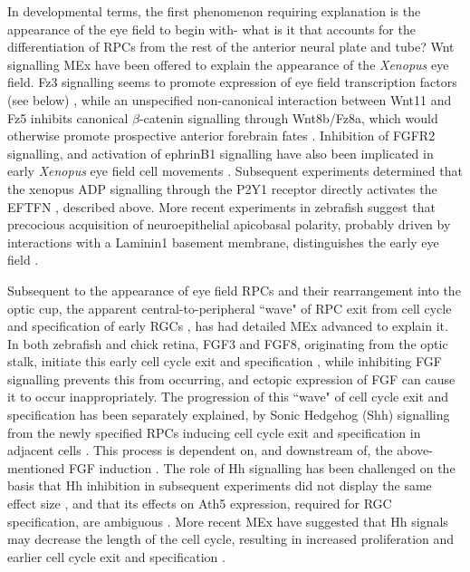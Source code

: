 In developmental terms, the first phenomenon requiring explanation is the appearance of the eye field to begin with- what is it that accounts for the differentiation of RPCs from the rest of the anterior neural plate and tube? Wnt signalling MEx have been offered to explain the appearance of the \textit{Xenopus} eye field. Fz3 signalling seems to promote expression of eye field transcription factors (see below) \cite{Rasmussen2001}, while an unspecified non-canonical interaction between Wnt11 and Fz5 inhibits canonical $\beta$-catenin signalling through Wnt8b/Fz8a, which would otherwise promote prospective anterior forebrain fates \cite{Cavodeassi2005}. Inhibition of FGFR2 signalling, and activation of ephrinB1 signalling have also been implicated in early \textit{Xenopus} eye field cell movements \cite{Moore2004}. Subsequent experiments determined that the xenopus ADP signalling through the P2Y1 receptor directly activates the EFTFN \cite{Masse2007}, described above. More recent experiments in zebrafish suggest that precocious acquisition of neuroepithelial apicobasal polarity, probably driven by interactions with a Laminin1 basement membrane, distinguishes the early eye field \cite{Ivanovitch2013}.

Subsequent to the appearance of eye field RPCs and their rearrangement into the optic cup, the apparent central-to-peripheral ``wave" of RPC exit from cell cycle and specification of early RGCs \cite{Hu1999}, has had detailed MEx advanced to explain it. In both zebrafish and chick retina, FGF3 and FGF8, originating from the optic stalk, initiate this early cell cycle exit and specification \cite{Martinez-Morales2005}, while inhibiting FGF signalling prevents this from occurring, and ectopic expression of FGF can cause it to occur inappropriately. The progression of this ``wave" of cell cycle exit and specification has been separately explained, by Sonic Hedgehog (Shh) signalling from the newly specified RPCs inducing cell cycle exit and specification in adjacent cells \cite{Neumann2000}. This process is dependent on, and downstream of, the above-mentioned FGF induction \cite{Martinez-Morales2005}. The role of Hh signalling has been challenged on the basis that Hh inhibition in subsequent experiments did not display the same effect size \cite{Stenkamp2003}, and that its effects on Ath5 expression, required for RGC specification, are ambiguous \cite{Agathocleous2009}. More recent MEx have suggested that Hh signals may decrease the length of the cell cycle, resulting in increased proliferation and earlier cell cycle exit and specification \cite{Locker2006, Agathocleous2007}.

